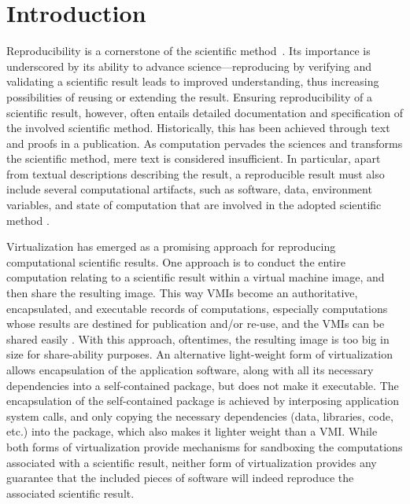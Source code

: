 \section{Introduction}

Reproducibility is a cornerstone of the scientific method~\cite{borgman2012data}. 
Its importance is underscored by its ability to advance science---reproducing by verifying and validating a scientific result leads to improved understanding, thus increasing possibilities of reusing or extending the result. 
Ensuring reproducibility of a scientific result, however, often entails detailed documentation and specification of the involved scientific method. Historically, this has been achieved through text and proofs in a publication. 
As computation pervades the sciences and transforms the scientific method, mere text is considered insufficient. 
In particular, apart from textual descriptions describing the result, a reproducible result must also include several computational artifacts, such as software, data,  environment variables, and state of computation that are involved in the adopted scientific method \cite{Sole}.  

Virtualization has emerged as a promising approach for reproducing computational scientific results. One approach is to conduct the entire computation relating to a scientific result within a virtual machine image, and then share the resulting image. This way VMIs become an authoritative, encapsulated, and executable records of computations, especially computations whose results are destined for publication and/or re-use, and the VMIs can be shared easily \cite{Lampoudi}. 
With this approach, oftentimes, the resulting image is too big in size for share-ability purposes. An alternative light-weight form of virtualization allows encapsulation of the application software, along with all its necessary dependencies into a self-contained package, but does not make it executable.
The encapsulation of the self-contained package is achieved by interposing application system calls, and only copying the necessary dependencies (data, libraries, code, etc.) into the package, which also makes it lighter weight than a VMI. While both forms of virtualization provide mechanisms for sandboxing the computations associated with a scientific result, neither form of virtualization provides any guarantee that the included pieces of software will indeed reproduce the associated scientific result. 

